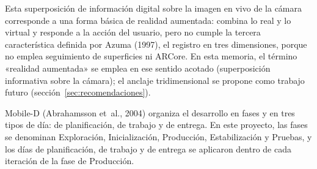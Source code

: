 
Esta superposición de información digital sobre la imagen en vivo de la
cámara corresponde a una forma básica de realidad aumentada: combina lo real y
lo virtual y responde a la acción del usuario, pero no cumple la tercera
característica definida por Azuma (1997), el registro en tres dimensiones,
porque no emplea seguimiento de superficies ni ARCore. En esta memoria, el
término «realidad aumentada» se emplea en ese sentido acotado
(superposición informativa sobre la cámara); el anclaje tridimensional se
propone como trabajo futuro (sección~\ref{sec:recomendaciones}).

Mobile-D (Abrahamsson et~al., 2004) organiza el desarrollo en fases y en tres
tipos de día: de planificación, de trabajo y de entrega. En este proyecto, las
fases se denominan Exploración, Inicialización, Producción, Estabilización y
Pruebas, y los días de planificación, de trabajo y de entrega se aplicaron
dentro de cada iteración de la fase de Producción. 


